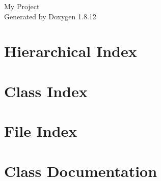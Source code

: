 \documentclass[twoside]{book}
\newcommand{\+}{\discretionary{\mbox{\scriptsize$\hookleftarrow$}}{}{}}
\newcommand{\clearemptydoublepage}{%
  \newpage{\pagestyle{empty}\cleardoublepage}%
}
\begin{document}
\hypersetup{pageanchor=false,
             bookmarksnumbered=true,
             pdfencoding=unicode
            }
\begin{titlepage}
\vspace*{7cm}
\begin{center}%
{\Large My Project }\\
\vspace*{1cm}
{\large Generated by Doxygen 1.8.12}\\
\end{center}
\end{titlepage}
\clearemptydoublepage
{}
\tableofcontents
\clearemptydoublepage
{}
\hypersetup{pageanchor=true}

\chapter{Hierarchical Index}

\chapter{Class Index}

\chapter{File Index}

\chapter{Class Documentation}

































\end{document}
